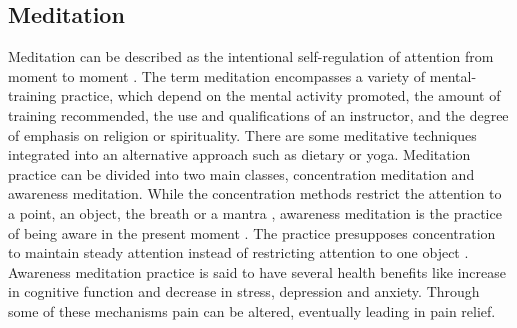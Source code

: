 \subsection{Meditation}

Meditation can be described as the intentional self-regulation of attention from moment to moment \cite{Kabat1982}.
The term meditation encompasses a variety of mental-training practice, which depend on the mental activity promoted, the amount of training recommended, the use and qualifications of an instructor, and the degree of emphasis on religion or spirituality. There are some meditative techniques integrated into an alternative approach such as dietary or yoga. \cite{Goyal2014} Meditation practice can be divided into two main classes, concentration meditation and awareness meditation. While the concentration methods restrict the attention to a point, an object, the breath or a mantra \cite{Kabat1982}, awareness meditation is the practice of being aware in the present moment \cite{Zeidan2016}. The practice presupposes concentration to maintain steady attention instead of restricting attention to one object \cite{Kabat1982}. Awareness meditation practice is said to have several health benefits like increase in cognitive function and decrease in stress, depression and anxiety. Through some of these mechanisms pain can be altered, eventually leading in pain relief. \cite{Zeidan2016} 


